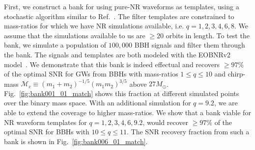 First, we construct a bank for using pure-NR waveforms as templates, 
using a stochastic algorithm similar to Ref.~\cite{Harry:2009ea,
Ajith:2012mn,Manca:2009xw}. The filter templates are constrained to 
mass-ratios for which we have NR simulations available, i.e. 
$q=1,2,3,4,6,8$. 
We assume that the simulations available to us are $\geq 20$ orbits in
length. To test the bank, we simulate a population of $100,000$ BBH 
signals and filter them through the bank. The signals and templates 
are both modeled with the EOBNRv2 model~\cite{BuonannoEOBv2Main}. We 
demonstrate that this bank is indeed effectual and recovers 
$\geq 97\%$ of the optimal SNR for GWs from BBHs with mass-ratios 
$1\leq q\leq 10$ and chirp-mass 
$\mathcal{M}_c\equiv (m_1+m_2)^{-1/5}(m_1 m_2)^{3/5}$ above $27M_\odot$. 
Fig.~\ref{fig:bank001_01_match} shows this fraction at different 
simulated points over the binary mass space. With an additional 
simulation for $q=9.2$, we are able to extend the coverage to higher
mass-ratios. We show that a bank viable for NR waveform templates for
$q=1,2,3,4,6,9.2$, would recover $\geq 97\%$ of the optimal SNR
for BBHs with $10\leq q\leq 11$. The SNR recovery fraction from
such a bank is shown in Fig.~\ref{fig:bank006_01_match}.


